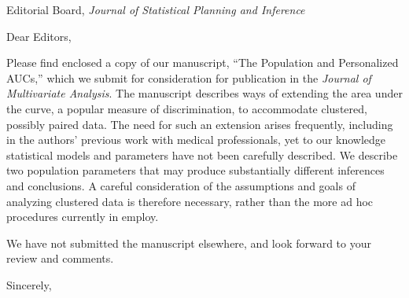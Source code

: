 \documentclass[10pt]{letter}
\begin{document}

\begin{letter}{Editorial Board, \emph{Journal of Statistical Planning and Inference} } %


\opening{Dear Editors,}

Please find enclosed a copy of our manuscript, ``The Population and
Personalized AUCs,'' which we submit for
consideration for publication in the \emph{Journal of Multivariate
  Analysis}. The manuscript describes ways of extending the area under the curve, a popular measure of discrimination, to
accommodate clustered, possibly paired data. The need for such an
extension arises frequently, including in the authors' previous work with medical professionals,
yet to our knowledge statistical models and parameters have not been
carefully described. We describe two population parameters that may
produce substantially different inferences and conclusions. A careful
consideration of the assumptions and goals of analyzing clustered data
is therefore necessary, rather than the more ad hoc procedures
currently in employ. %

We have not submitted the manuscript elsewhere, and look forward to your review and
comments.

\vspace{2\parskip} %
\closing{Sincerely,}


\end{letter}
\end{document}
